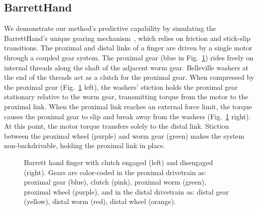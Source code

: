 \subsection{BarrettHand}
\label{sec:barrett_hand}

We demonstrate our method's predictive capability by simulating the
BarrettHand's unique gearing mechanism~\cite{bib:barretthand}, which relies on
friction and stick-slip transitions. The proximal and distal links of a finger
are driven by a single motor through a coupled gear system. The proximal gear
(blue in Fig.~\ref{fig:barrett_snapshots}) rides freely on internal threads
along the shaft of the adjacent worm gear. Belleville washers at the end of the
threads act as a clutch for the proximal gear. When compressed by the proximal
gear (Fig.~\ref{fig:barrett_snapshots} left), the washers' stiction holds the
proximal gear stationary relative to the worm gear, transmitting torque from the
motor to the proximal link. When the proximal link reaches an external force
limit, the torque causes the proximal gear to slip and break away from the
washers (Fig.~\ref{fig:barrett_snapshots} right). At this point, the motor
torque transfers solely to the distal link. Stiction between the proximal wheel
(purple) and worm gear (green) makes the system non-backdrivable, holding the
proximal link in place.

\begin{figure}[!h]
    \centering
    \caption{\label{fig:barrett_snapshots} Barrett hand finger with clutch
        engaged (left) and disengaged (right). Gears are color-coded in the proximal
        drivetrain as: proximal gear (blue), clutch (pink), proximal worm (green),
        proximal wheel (purple), and in the distal drivetrain as: distal gear
        (yellow), distal worm (red), distal wheel (orange).}
\end{figure}

